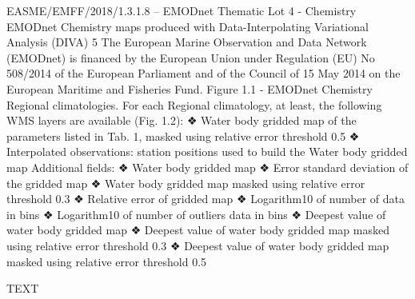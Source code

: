 \documentclass[essd, manuscript]{copernicus}
\begin{document}
EASME/EMFF/2018/1.3.1.8 – EMODnet Thematic Lot 4 - Chemistry
EMODnet Chemistry maps produced with
Data-Interpolating Variational Analysis (DIVA)
5
The European Marine Observation and Data Network (EMODnet) is financed by the European Union under Regulation
(EU) No 508/2014 of the European Parliament and of the Council of 15 May 2014 on the European Maritime and
Fisheries Fund.
Figure 1.1 - EMODnet Chemistry Regional climatologies.
For each Regional climatology, at least, the following WMS layers are available (Fig. 1.2):
❖ Water body gridded map of the parameters listed in Tab. 1, masked using relative error
threshold 0.5
❖ Interpolated observations: station positions used to build the Water body gridded map
Additional fields:
❖ Water body gridded map
❖ Error standard deviation of the gridded map
❖ Water body gridded map masked using relative error threshold 0.3
❖ Relative error of gridded map
❖ Logarithm10 of number of data in bins
❖ Logarithm10 of number of outliers data in bins
❖ Deepest value of water body gridded map
❖ Deepest value of water body gridded map masked using relative error threshold 0.3
❖ Deepest value of water body gridded map masked using relative error threshold 0.5

\conclusions  %
TEXT






\end{document}

